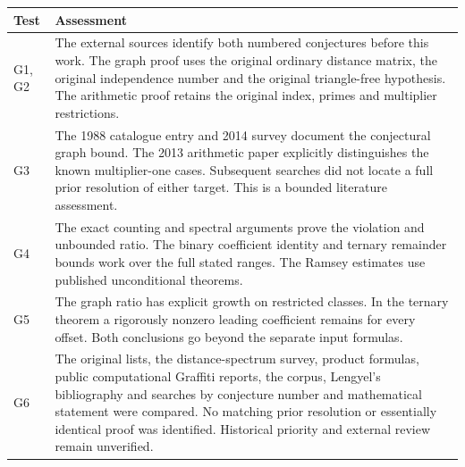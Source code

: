 \documentclass[11pt,a4paper]{article}
\begin{document}
\begin{center}\small
\begin{tabularx}{\linewidth}{@{}p{.105\linewidth}X@{}}
\toprule
Test & Assessment\\ \midrule
G1, G2 & The external sources identify both numbered conjectures before this work.
The graph proof uses the original ordinary distance matrix, the original
independence number and the original triangle-free hypothesis. The
arithmetic proof retains the original index, primes and multiplier restrictions.\\
G3 & The 1988 catalogue entry and 2014 survey document the conjectural graph
bound. The 2013 arithmetic paper explicitly distinguishes the known
multiplier-one cases. Subsequent searches did not locate a full prior resolution
of either target. This is a bounded literature assessment.\\
G4 & The exact counting and spectral arguments prove the violation and
unbounded ratio. The binary coefficient identity and ternary remainder
bounds work over the full stated ranges. The Ramsey estimates use published
unconditional theorems.\\
G5 & The graph ratio has explicit growth on restricted classes. In the ternary
theorem a rigorously nonzero leading coefficient remains for every offset.
Both conclusions go beyond the separate input formulas.\\
G6 & The original lists, the distance-spectrum survey, product formulas,
public computational Graffiti reports, the corpus, Lengyel's bibliography
and searches by conjecture number and mathematical statement were compared.
No matching prior resolution or essentially identical proof was identified.
Historical priority and external review remain unverified.\\
\bottomrule
\end{tabularx}
\end{center}
\end{document}
